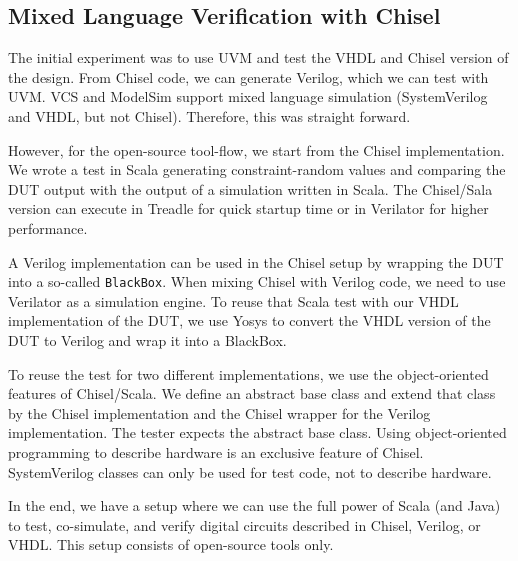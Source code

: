 \documentclass[conference]{IEEEtran}
\newcommand{\code}[1]{{\small{\texttt{#1}}}}
\newcommand{\martin}[1]{{\color{blue} Martin: #1}}
\newcommand{\ducky}[1]{{\color{orange} Richard: #1}}
\renewcommand{\martin}[1]{}
\renewcommand{\ducky}[1]{}
\begin{document}
\subsection{Mixed Language Verification with Chisel}
\label{sec:verif-chisel}

The initial experiment was to use UVM and test the VHDL and Chisel version of the
design. From Chisel code, we can generate Verilog, which we can test with UVM.
VCS and ModelSim support mixed language simulation (SystemVerilog and VHDL,
but not Chisel). Therefore, this was straight forward.

However, for the open-source tool-flow, we start from the Chisel implementation.
We wrote a test in Scala generating constraint-random values and comparing
the DUT output with the output of a simulation written in Scala. 
The Chisel/Sala version can execute in Treadle for  quick startup time or in Verilator
for higher performance.

A Verilog implementation can be used in the Chisel setup by wrapping the DUT
into a so-called \code{BlackBox}. When mixing Chisel with Verilog code, we need
to use Verilator as a simulation engine.
To reuse that Scala test with our VHDL implementation of the DUT, we use Yosys
to convert the VHDL version of the DUT to Verilog and wrap it into a BlackBox.

To reuse the test for two different implementations, we use the object-oriented features
of Chisel/Scala. We define an abstract base class and extend that class by the Chisel
implementation and the Chisel wrapper for the Verilog implementation.
The tester expects the abstract base class.
Using object-oriented programming to describe hardware is an exclusive
feature of Chisel. SystemVerilog classes can only be used for test code,
not to describe hardware.

In the end, we have a setup where we can use the full power of Scala (and Java)
to test, co-simulate, and verify digital circuits described in Chisel, Verilog, or VHDL.
This setup consists of open-source tools only.


\end{document}
